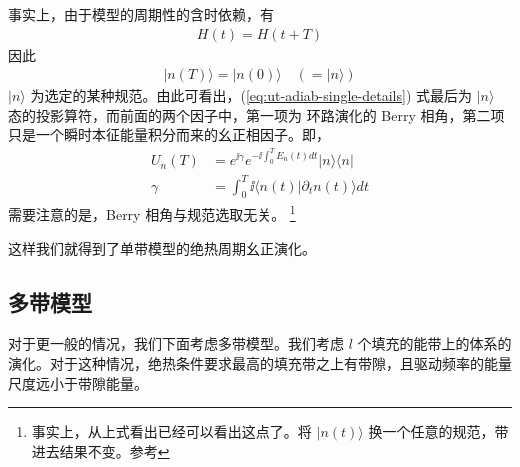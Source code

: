 事实上，由于模型的周期性的含时依赖，有
\begin{align}
H(t) = H(t+T)
\end{align}
因此
\begin{align}
|n(T)\rangle=|n(0)\rangle \quad (=|n\rangle)
\end{align}
$|n\rangle$ 为选定的某种规范。由此可看出，(\ref{eq:ut-adiab-single-details}) 式最后为 $|n\rangle$ 态的投影算符，而前面的两个因子中，第一项为 环路演化的 Berry 相角\cite{niu2010}，第二项只是一个瞬时本征能量积分而来的幺正相因子。即，
\begin{align}
U_n(T) &= e^{\ii\gamma}e^{-\ii\int_0^TE_n(t)dt}|n\rangle\langle n|\\
\gamma &=\int_0^T\ii\langle n(t)|\partial_tn(t)\rangle dt
\end{align}
需要注意的是，Berry 相角与规范选取无关。
\footnote{事实上，从上式看出已经可以看出这点了。将 $|n(t)\rangle$ 换一个任意的规范，带进去结果不变。参考}

这样我们就得到了单带模型的绝热周期幺正演化。



\subsection{多带模型}\label{sec:adiab:multi}

对于更一般的情况，我们下面考虑多带模型。我们考虑 $l$ 个填充的能带上的体系的演化。对于这种情况，绝热条件要求最高的填充带之上有带隙，且驱动频率的能量尺度远小于带隙能量。

